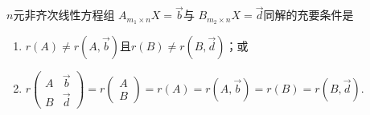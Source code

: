 \begin{theorem}{}{}
    $n$元非齐次线性方程组 $A_{m_1 \times n}X=\vec{b}$与 $B_{m_2 \times n}X=\vec{d}$同解的充要条件是
    \begin{enumerate}
        \item $r(A)\neq r(A,\vec{b})$且$r(B)\neq r(B,\vec{d})$；或

        \item $r\begin{pmatrix}
                      A & \vec{b} \\ B & \vec{d}
                  \end{pmatrix}=r\begin{pmatrix}
                      A \\ B
                  \end{pmatrix}=r(A)=r(A,\vec{b})=r(B)=r(B,\vec{d})$.
    \end{enumerate}
\end{theorem}

